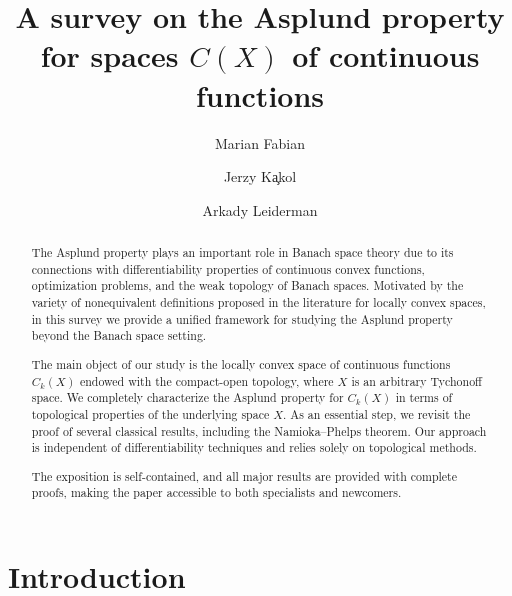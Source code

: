 \documentclass[12pt]{amsart}
\date{}
\theoremstyle{plain}
\theoremstyle{definition}
\theoremstyle{remark}
\begin{document}
\title[A survey on the Asplund property for spaces  $C(X)$]{A survey on the Asplund property for spaces  $C(X)$ of continuous functions}
\author{Marian Fabian}
\address{Institute of Mathematics, Czech Academy of Sciences, Prague, Czech Republic}
\author{Jerzy K{\c{a}}kol}
\address{Faculty of Mathematics and Informatics, A. Mickiewicz University,
61-614 Pozna\'{n}, Poland}
\author{Arkady Leiderman}
\address{Department of Mathematics, Ben-Gurion University of the Negev, Beer Sheva, P.O.B. 653, Israel}

\begin{abstract}
The Asplund property plays an important role in Banach space theory due to its connections with differentiability properties of continuous convex functions, optimization problems, and the weak topology of Banach spaces.
Motivated by the variety of nonequivalent definitions proposed in the literature for locally convex spaces, in this survey we provide a unified framework for studying the Asplund property beyond the Banach space setting.

 The main object of our study is the locally convex space of continuous functions $C_k(X)$ endowed with the compact-open topology, where $X$ is an arbitrary Tychonoff space.
We completely characterize the Asplund property for $C_k(X)$ in terms of topological properties of the underlying space $X$.
 As an essential step, we revisit the proof of several classical results, including the Namioka--Phelps theorem. Our approach is independent of differentiability techniques and relies solely on topological methods.

The exposition is self-contained, and all major results are provided with complete proofs, making the paper accessible to both specialists and newcomers.

\end{abstract}

\bigskip

\maketitle
\section{Introduction}
\end{document}
